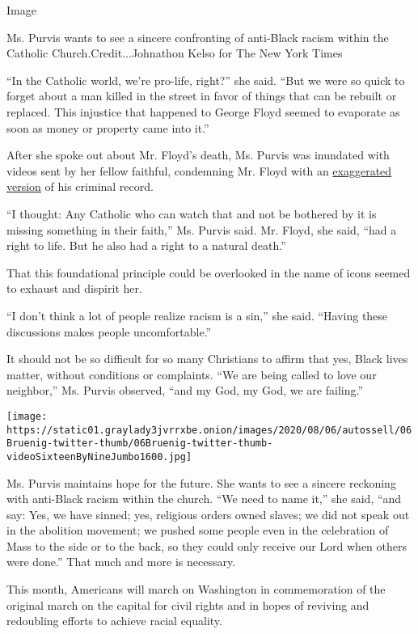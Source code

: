 Image

Ms. Purvis wants to see a sincere confronting of anti-Black racism
within the Catholic Church.Credit...Johnathon Kelso for The New York
Times

``In the Catholic world, we're pro-life, right?'' she said. ``But we
were so quick to forget about a man killed in the street in favor of
things that can be rebuilt or replaced. This injustice that happened to
George Floyd seemed to evaporate as soon as money or property came into
it.''

After she spoke out about Mr. Floyd's death, Ms. Purvis was inundated
with videos sent by her fellow faithful, condemning Mr. Floyd with an
\href{https://www.snopes.com/news/2020/06/12/george-floyd-criminal-record/}{exaggerated
version} of his criminal record.

``I thought: Any Catholic who can watch that and not be bothered by it
is missing something in their faith,'' Ms. Purvis said. Mr. Floyd, she
said, ``had a right to life. But he also had a right to a natural
death.''

That this foundational principle could be overlooked in the name of
icons seemed to exhaust and dispirit her.

``I don't think a lot of people realize racism is a sin,'' she said.
``Having these discussions makes people uncomfortable.''

It should not be so difficult for so many Christians to affirm that yes,
Black lives matter, without conditions or complaints. ``We are being
called to love our neighbor,'' Ms. Purvis observed, ``and my God, my
God, we are failing.''

\texttt{[image: https://static01.graylady3jvrrxbe.onion/images/2020/08/06/autossell/06Bruenig-twitter-thumb/06Bruenig-twitter-thumb-videoSixteenByNineJumbo1600.jpg]}

Ms. Purvis maintains hope for the future. She wants to see a sincere
reckoning with anti-Black racism within the church. ``We need to name
it,'' she said, ``and say: Yes, we have sinned; yes, religious orders
owned slaves; we did not speak out in the abolition movement; we pushed
some people even in the celebration of Mass to the side or to the back,
so they could only receive our Lord when others were done.'' That much
and more is necessary.

This month, Americans will march on Washington in commemoration of the
original march on the capital for civil rights and in hopes of reviving
and redoubling efforts to achieve racial equality.

